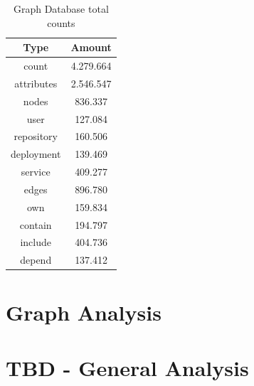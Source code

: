 \begin{table}[h!]
    \centering
    \begin{tabular}{ |c|c| }
    \hline
    Type & Amount \\
    \hline
         count & 4.279.664 \\
         attributes & 2.546.547 \\
         \hline
         nodes & 836.337 \\
         \hline
         user & 127.084 \\
         repository & 160.506\\
         deployment & 139.469\\
         service & 409.277\\
         \hline
         edges & 896.780 \\
         \hline
         own & 159.834 \\
         contain & 194.797 \\
         include & 404.736 \\
         depend & 137.412 \\
    \hline
    \end{tabular}
    \caption{Graph Database total counts}
    \label{graph_database_total_counts}
\end{table}



\section{Graph Analysis}
\section{TBD - General Analysis}